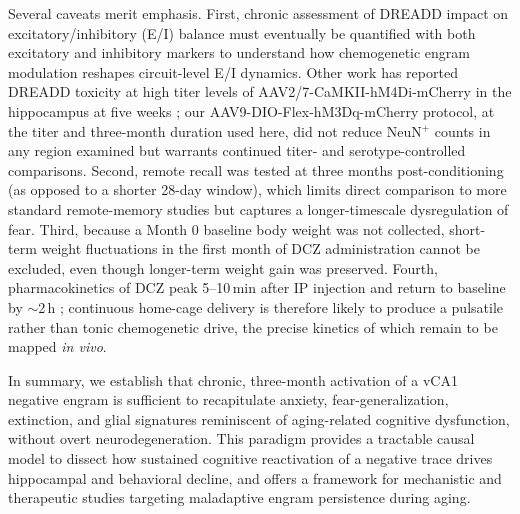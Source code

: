 \documentclass[11pt]{article}
\begin{document}
Several caveats merit emphasis. First, chronic assessment of DREADD impact on excitatory/inhibitory (E/I) balance must eventually be quantified with both excitatory and inhibitory markers to understand how chemogenetic engram modulation reshapes circuit-level E/I dynamics. Other work has reported DREADD toxicity at high titer levels of AAV2/7-CaMKII-hM4Di-mCherry in the hippocampus at five weeks \citep{goossens2021}; our AAV9-DIO-Flex-hM3Dq-mCherry protocol, at the titer and three-month duration used here, did not reduce NeuN$^{+}$ counts in any region examined but warrants continued titer- and serotype-controlled comparisons. Second, remote recall was tested at three months post-conditioning (as opposed to a shorter 28-day window), which limits direct comparison to more standard remote-memory studies but captures a longer-timescale dysregulation of fear. Third, because a Month 0 baseline body weight was not collected, short-term weight fluctuations in the first month of DCZ administration cannot be excluded, even though longer-term weight gain was preserved. Fourth, pharmacokinetics of DCZ peak 5--10\,min after IP injection and return to baseline by $\sim$2\,h \citep{nagai2020}; continuous home-cage delivery is therefore likely to produce a pulsatile rather than tonic chemogenetic drive, the precise kinetics of which remain to be mapped \emph{in vivo}.

In summary, we establish that chronic, three-month activation of a vCA1 negative engram is sufficient to recapitulate anxiety, fear-generalization, extinction, and glial signatures reminiscent of aging-related cognitive dysfunction, without overt neurodegeneration. This paradigm provides a tractable causal model to dissect how sustained cognitive reactivation of a negative trace drives hippocampal and behavioral decline, and offers a framework for mechanistic and therapeutic studies targeting maladaptive engram persistence during aging.



\end{document}
